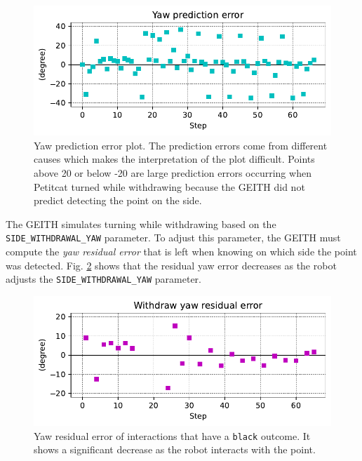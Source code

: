 \documentclass[runningheads]{llncs}
\begin{document}
\begin{figure}
	\includegraphics[width=\textwidth]{02_yaw_pe.pdf}
	\caption{Yaw prediction error plot. The prediction errors come from different causes which makes the interpretation of the plot difficult. 
		Points above 20 or below -20 are large prediction errors occurring when Petitcat turned while withdrawing because the GEITH did not predict detecting the point on the side.
	} \label{fig:yaw_pe}
\end{figure}

The GEITH simulates turning while withdrawing based on the \texttt{SIDE\_WITH\-DRA\-WAL\_YAW} parameter.
To adjust this parameter, the GEITH must 
compute the \textit{yaw residual error} 
that is left when knowing on which side the point was detected. 
Fig. \ref{fig:yaw_re} shows that the residual yaw error decreases as the robot adjusts the \texttt{SIDE\_WITH\-DRA\-WAL\_YAW} parameter.

\begin{figure}
	\includegraphics[width=\textwidth]{03_yaw_re.pdf}
	\caption{Yaw residual error of interactions that have a \texttt{black} outcome. 
		It shows a significant decrease as the robot interacts with the point.
	} \label{fig:yaw_re}
\end{figure}
\end{document}
